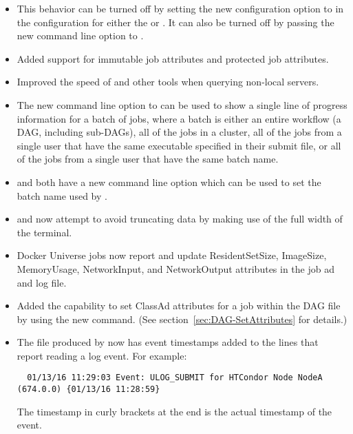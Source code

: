 \begin{itemize}

\item {} This behavior
can be turned off by setting the new configuration option 
to  in the configuration for either the  or . It can also be 
turned off by passing the new  command line option to .

\item Added support for immutable job attributes and protected job attributes.

\item Improved the speed of  and other tools when
querying non-local servers.

\item The new  command line option to  can be used to show a single
line of progress information for a batch of jobs, where a batch is either an entire workflow (a DAG, including sub-DAGs), all
of the jobs in a cluster, all of the jobs from a single user that have the same executable specified in their submit file,
or all of the jobs from a single user that have the same batch name.

\item {} and  both have a new command line option 
which can be used to set the batch name used by  .

\item {} and  now attempt to avoid truncating data by making use of the
full width of the terminal.

\item Docker Universe jobs now report and update
ResidentSetSize, ImageSize, MemoryUsage, NetworkInput, and 
NetworkOutput attributes in the job ad and log file.

\item Added the capability to set ClassAd attributes for a
 job within the DAG file by using the new
 command.  (See section~\ref{sec:DAG-SetAttributes}
for details.)

\item The  file produced by  now has event
timestamps added to the lines that report  reading
a log event.  For example:
\begin{verbatim}
  01/13/16 11:29:03 Event: ULOG_SUBMIT for HTCondor Node NodeA (674.0.0) {01/13/16 11:28:59}
\end{verbatim}
The timestamp in curly brackets at the end is the actual timestamp
of the event.


\end{itemize}
